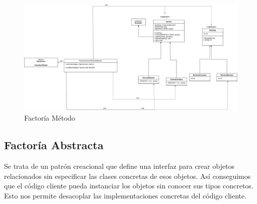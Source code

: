 \documentclass{article}
\begin{document}
\newpage
\begin{figure}[h]
	\includegraphics[width=1\textwidth]{factoria_metodo.png}
	\caption{Factoría Método}
	\label{fig:factoria_metodo}
\end{figure}

\subsection{Factoría Abstracta}
Se trata de un patrón creacional que define una interfaz para crear objetos relacionados sin especificar las clases concretas de esos objetos. Así conseguimos que el código cliente pueda instanciar los objetos sin conocer sus tipos concretos. Esto nos permite desacoplar las implementaciones concretas del código cliente. \\
\end{document}
